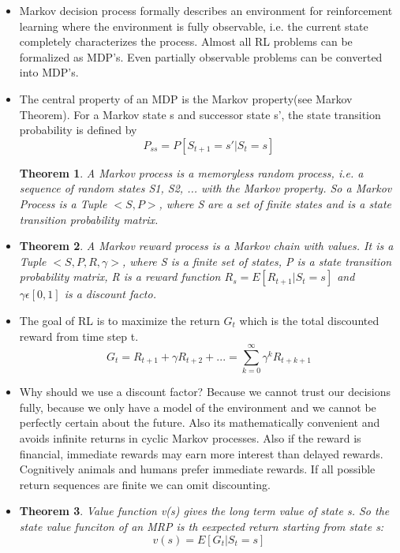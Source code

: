 \documentclass[a4paper]{article}
\newtheorem{theorem}{Theorem}
\begin{document}
\begin{itemize}
    \item Markov decision process formally describes an environment for reinforcement learning where the environment is fully observable, i.e. the current state completely characterizes the process. Almost all RL problems can be formalized as MDP's. Even partially observable problems can be converted into MDP's. 
    \item The central property of an MDP is the Markov property(see Markov Theorem). For a Markov state s and successor state s', the state transition probability is defined by $$P_{ss} = P[S_{t+1} = s' | S_t = s]$$
    \begin{theorem}
    A Markov process is a memoryless random process, i.e. a sequence of random states S1, S2, ... with the Markov property. So a Markov Process is a Tuple $<S,P>$, where S are a set of finite states and  is a state transition probability matrix. 
    \end{theorem}
    \item 
    \begin{theorem}
        A Markov reward process is a Markov chain with values. It is a Tuple $< S, P, R, \gamma>$, where S is a finite set of states, P is a state transition probability matrix, R is a reward function $R_s = E[R_{t+1}|S_t = s]$ and $\gamma \epsilon [0,1]$ is a discount facto.
    \end{theorem}
    \item The goal of RL is to maximize the return $G_t$ which is the total discounted reward from time step t. $$G_t = R_{t+1} + \gamma R_{t+2} + ... = \sum_{k=0}^{\infty} \gamma^k R_{t+k+1}$$
    \item Why should we use a discount factor? Because we cannot trust our decisions fully, because we only have a model of the environment and we cannot be perfectly certain about the future. Also its mathematically convenient and avoids infinite returns in cyclic Markov processes. Also if the reward is financial, immediate rewards may earn more interest than delayed rewards. Cognitively animals and humans prefer immediate rewards. 
    If all possible return sequences are finite we can omit discounting. 
    \item 
    \begin{theorem}
    Value function v(s) gives the long term value of state s. So the state value funciton of an MRP is th eexpected return starting from state s: $$ v(s) = E[G_t|S_t = s]$$
    \end{theorem}

\end{itemize}
\end{document}
